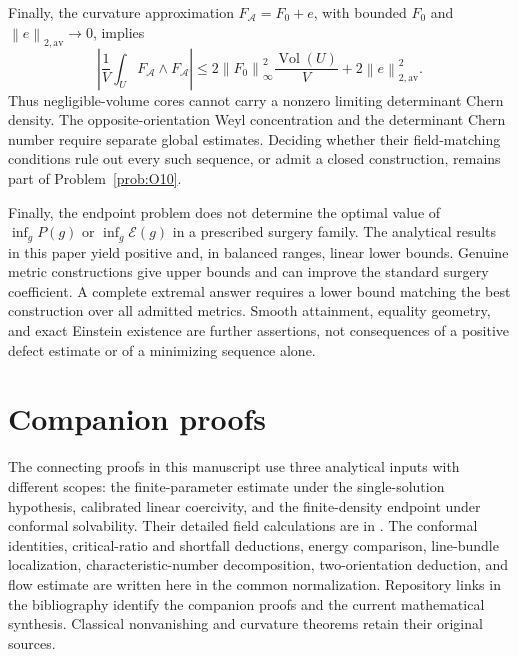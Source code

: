 \documentclass[11pt,a4paper]{article}
\theoremstyle{definition}
\theoremstyle{remark}
\newcommand{\Vol}{\operatorname{Vol}}
\newcommand{\E}{\mathcal E}
\newcommand{\Acal}{\mathcal A}
\newcommand{\norm}[1]{\left\lVert#1\right\rVert}
\begin{document}
Finally, the curvature approximation $F_{\Acal}=F_0+e$, with bounded $F_0$ and $\norm e_{2,\mathrm{av}}\to0$, implies
\[
 \left|\frac1V\int_UF_{\Acal}\wedge F_{\Acal}\right|
 \le2\norm{F_0}_\infty^2\frac{\Vol(U)}V+2\norm e_{2,\mathrm{av}}^2.
\]
Thus negligible-volume cores cannot carry a nonzero limiting determinant Chern density. The opposite-orientation Weyl concentration and the determinant Chern number require separate global estimates. Deciding whether their field-matching conditions rule out every such sequence, or admit a closed construction, remains part of Problem~\ref{prob:O10}.

Finally, the endpoint problem does not determine the optimal value of $\inf_gP(g)$ or $\inf_g\E(g)$ in a prescribed surgery family. The analytical results in this paper yield positive and, in balanced ranges, linear lower bounds. Genuine metric constructions give upper bounds and can improve the standard surgery coefficient. A complete extremal answer requires a lower bound matching the best construction over all admitted metrics. Smooth attainment, equality geometry, and exact Einstein existence are further assertions, not consequences of a positive defect estimate or of a minimizing sequence alone.

\section*{Companion proofs}
The connecting proofs in this manuscript use three analytical inputs with different scopes: the finite-parameter estimate under the single-solution hypothesis, calibrated linear coercivity, and the finite-density endpoint under conformal solvability. Their detailed field calculations are in \cite{Parameter,AnalyticCore,SingleLinear,Linear,FDcomplete}. The conformal identities, critical-ratio and shortfall deductions, energy comparison, line-bundle localization, characteristic-number decomposition, two-orientation deduction, and flow estimate are written here in the common normalization. Repository links in the bibliography identify the companion proofs and the current mathematical synthesis. Classical nonvanishing and curvature theorems retain their original sources.
\end{document}
